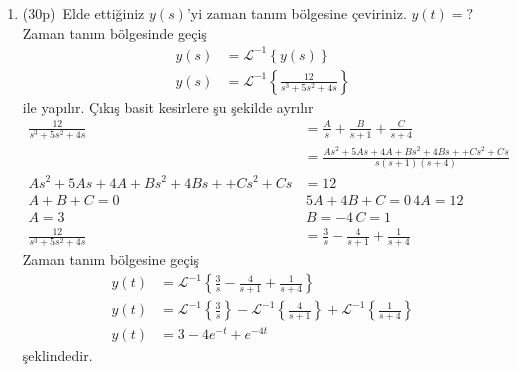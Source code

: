 \begin{enumerate}
    \item(30p)\, Elde ettiğiniz $y(s)$'yi zaman tanım bölgesine çeviriniz. $y(t)=?$
    Zaman tanım bölgesinde geçiş
    \begin{equation}
        \begin{split}
            y(s)&=\mathcal{L}^{-1}\left\{y(s)\right\}\\
            y(s)&=\mathcal{L}^{-1}\left\{\frac{12}{s^3+5s^2+4s}\right\}
        \end{split}
    \end{equation}
    ile yapılır. Çıkış basit kesirlere şu şekilde ayrılır
    \begin{equation}
        \begin{split}
            \frac{12}{s^3+5s^2+4s}&=\frac{A}{s}+\frac{B}{s+1}+\frac{C}{s+4}\\
            &=\frac{As^2+5As+4A+Bs^2+4Bs++Cs^2+Cs}{s(s+1)(s+4)}\\
            As^2+5As+4A+Bs^2+4Bs++Cs^2+Cs&=12\\
            A+B+C=0\,&\,5A+4B+C=0\,4A=12\\
            A=3\,&\,B=-4\,C=1\\
            \frac{12}{s^3+5s^2+4s}&=\frac{3}{s}-\frac{4}{s+1}+\frac{1}{s+4}
        \end{split}
    \end{equation}
    Zaman tanım bölgesine geçiş
    \begin{equation}
        \begin{split}
            y(t)&=\mathcal{L}^{-1}\left\{\frac{3}{s}-\frac{4}{s+1}+\frac{1}{s+4}\right\}\\
            y(t)&=\mathcal{L}^{-1}\left\{\frac{3}{s}\right\}-\mathcal{L}^{-1}\left\{\frac{4}{s+1}\right\}+\mathcal{L}^{-1}\left\{\frac{1}{s+4}\right\}\\
            y(t)&=3-4e^{-t}+e^{-4t}
        \end{split}
    \end{equation}
    şeklindedir.
\end{enumerate}